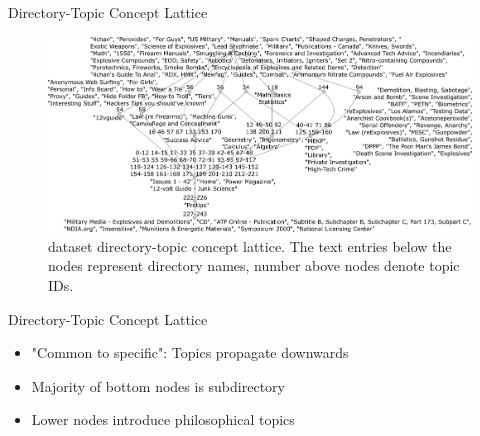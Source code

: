 \begin{frame}{Directory-Topic Concept Lattice}

    \begin{figure}[t]
        \centering
        \includegraphics[width=\textwidth]{images/fca_graph_across_dirs_02_03_25_altered3.png}
        \caption{\ac{dataset} directory-topic concept lattice.
            The text entries below the nodes represent directory names, number above nodes denote topic IDs.
        }
        \label{fig:fca_across_dirs}
    \end{figure}
    
\end{frame}

\begin{frame}{Directory-Topic Concept Lattice}

    \begin{itemize}
        \item "Common to specific": Topics propagate downwards 
        \item<2-> Majority of bottom nodes is subdirectory
        \item<3-> Lower nodes introduce philosophical topics
    \end{itemize}

\end{frame}